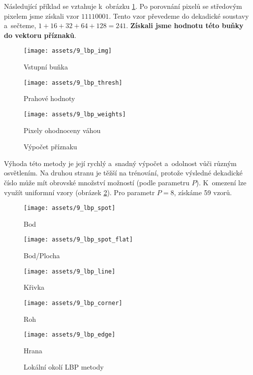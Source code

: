 Následující příklad se vztahuje k~obrázku \ref{fig:lbpsum}. Po porovnání pixelů se středovým pixelem jsme získali vzor $11110001$. Tento vzor převedeme do dekadické soustavy a~sečteme, $ 1+16+32+64+128 = 241$. \textbf{Získali jsme hodnotu této buňky do vektoru příznaků}.

\begin{figure}[H]
    \centering
    \begin{minipage}[b]{.3\textwidth}
        \centering
        \texttt{[image: assets/9\_lbp\_img]}
        \caption*{Vstupní buňka}
        \label{fig:lpbimg}
    \end{minipage}%
    \begin{minipage}[b]{.3\textwidth}
        \centering
        \texttt{[image: assets/9\_lbp\_thresh]}
        \caption*{Prahové hodnoty}
        \label{fig:lbpthresh}
    \end{minipage}
    \begin{minipage}[b]{.3\textwidth}
        \centering
        \texttt{[image: assets/9\_lbp\_weights]}
        \caption*{Pixely ohodnoceny váhou}
        \label{fig:lbpweights}
    \end{minipage}
    \caption{Výpočet příznaku}
    \label{fig:lbpsum}
\end{figure}

Výhoda této metody je její rychlý a~snadný výpočet a~odolnost vůči různým osvětlením. Na druhou stranu je těžší na trénování, protože výsledné dekadické číslo může mít obrovské množství možností (podle parametru $P$). K~omezení lze využít uniformní vzory (obrázek \ref{fig:lbpvzory}). Pro parametr $P=8$, získáme 59 vzorů.

\begin{figure}[H]
    \centering
    \begin{minipage}[b]{.18\textwidth}
        \centering
        \texttt{[image: assets/9\_lbp\_spot]}
        \caption*{Bod}
    \end{minipage}
    \begin{minipage}[b]{.18\textwidth}
        \centering
        \texttt{[image: assets/9\_lbp\_spot\_flat]}
        \caption*{Bod/Plocha}
    \end{minipage}
    \begin{minipage}[b]{.18\textwidth}
        \centering
        \texttt{[image: assets/9\_lbp\_line]}
        \caption*{Křivka}
    \end{minipage}
    \begin{minipage}[b]{.18\textwidth}
        \centering
        \texttt{[image: assets/9\_lbp\_corner]}
        \caption*{Roh}
    \end{minipage}
    \begin{minipage}[b]{.18\textwidth}
        \centering
        \texttt{[image: assets/9\_lbp\_edge]}
        \caption*{Hrana}
    \end{minipage}
    \caption{Lokální okolí LBP metody}
    \label{fig:lbpvzory}
\end{figure}

